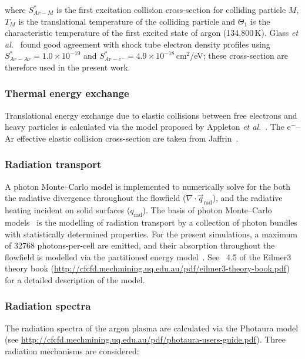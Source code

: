 \noindent where $S_{Ar-M}^*$ is the first excitation collision cross-section for colliding particle $M$, $T_M$ is the translational temperature of the colliding particle and $\Theta_1$ is the characteristic temperature of the first excited state of argon (134,800\,K).
Glass \textit{et al.}~\cite{GL78} found good agreement with shock tube electron density profiles using $S_{Ar-Ar}^* = 1.0 \times 10^{-19}$ and $S_{Ar-e^-}^* = 4.9 \times 10^{-18}$\,cm$^2$/eV; these cross-section are therefore used in the present work.
 
\subsubsection{Thermal energy exchange}

Translational energy exchange due to elastic collisions between free electrons and heavy particles is calculated via the model proposed by Appleton \textit{et al.}~\cite{appleton_1964}.
The e$^{-}$--Ar effective elastic collision cross-section are taken from Jaffrin~\cite{Jaf65}.

\subsubsection{Radiation transport}

A photon Monte--Carlo model is implemented to numerically solve for the both the radiative divergence throughout the flowfield ($\nabla \cdot \vec{q}_\text{rad}$), and the radiative heating incident on solid surfaces ($q_\text{rad}$).
The basis of photon Monte--Carlo models~\cite{HP64,Mod92,WM2007} is the modelling of radiation transport by a collection of photon bundles with statistically determined properties.
For the present simulations, a maximum of 32768 photons-per-cell are emitted, and their absorption throughout the flowfield is modelled via the partitioned energy model~\cite{MP77}.
See \textsection~4.5 of the Eilmer3 theory book (\url{http://cfcfd.mechmining.uq.edu.au/pdf/eilmer3-theory-book.pdf}) for a detailed description of the model.

\subsubsection{Radiation spectra}

The radiation spectra of the argon plasma are calculated via the Photaura model (see \url{http://cfcfd.mechmining.uq.edu.au/pdf/photaura-users-guide.pdf}).
Three radiation mechanisms are considered:

